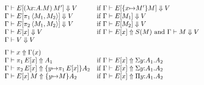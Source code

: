 \documentclass{article}
\theoremstyle{break}
\begin{document}
\newcommand{\weakconequiv}[4]{#1\vdash #2 \sim #3 : #4}
\newcommand{\conequiv}[4]{#1\vdash #2 \Join #3 : #4}
\newcommand{\aconequiv}[4]{#1\vdash #2 \iff #3 : #4}
\newcommand{\akindequiv}[3]{#1\vdash #2 \iff #3}
\newcommand{\headnormsto}[4]{#1\vdash #2 \Downarrow #4}
\newcommand{\reconstruct}[3]{#1\vdash #2 \Uparrow #3}
\newcommand{\isvalue}[3]{#1\vdash #2\mbox{\ value } #3}
\newcommand{\cvalue}{V}
\[
\!\!\!\!\!\!\!\begin{array}{lp{4.5truein}}
\headnormsto{\context}
   {E[\capply{(\cfunction{\cvar}{\kind}{\constructor})}
             {\constructor'}]}
   {\ktype}
   {\cvalue}&
   if 
   $\headnormsto{\context}
     {E[\substitute{\cvar}{\constructor'}{\constructor}]}{\ktype}{\cvalue}$\\

\headnormsto{\context}
   {E[\cpi{1}{\cpair{\constructor_1}{\constructor_2}}]}
   {\ktype}
   {\cvalue}&
   if
   $\headnormsto{\context}{E[\constructor_1]}{\ktype}{\cvalue}$\\
\headnormsto{\context}
   {E[\cpi{2}{\cpair{\constructor_1}{\constructor_2}}]}
   {\ktype}
   {\cvalue}&
   if
   $\headnormsto{\context}{E[\constructor_2]}{\ktype}{\cvalue}$\\
\headnormsto{\context}{E[\cvar]}{\ktype}{\cvalue}&
   if
   $\reconstruct{\context}{E[\cvar]}{\ksingleton{\constructor}}$ and
   $\headnormsto{\context}{\constructor}{\ktype}{\cvalue}$\\
\headnormsto{\context}{\cvalue}{\ktype}{\cvalue}\\[7pt]

\reconstruct{\context}{\cvar}{\context(\cvar)}\\
\reconstruct{\context}{\cpi{1}{E[\cvar]}}{\kind_1}&
  if
  $\reconstruct{\context}{E[\cvar]}{\ksigma{\othercvar}{\kind_1}{\kind_2}}$\\
\reconstruct{\context}{\cpi{2}{E[\cvar]}}
  {\substitute{\othercvar}{\cpi{1}{E[\cvar]}}\kind_2}&
  if
  $\reconstruct{\context}{E[\cvar]}{\ksigma{\othercvar}{\kind_1}{\kind_2}}$\\
\reconstruct{\context}{\capply{E[\cvar]}{\constructor}}
  {\substitute{\othercvar}{\constructor}{\kind_2}}&
  if
  $\reconstruct{\context}{E[\cvar]}{\kpi{\othercvar}{\kind_1}{\kind_2}}$\\[7pt]


\end{array}\]
\end{document}
